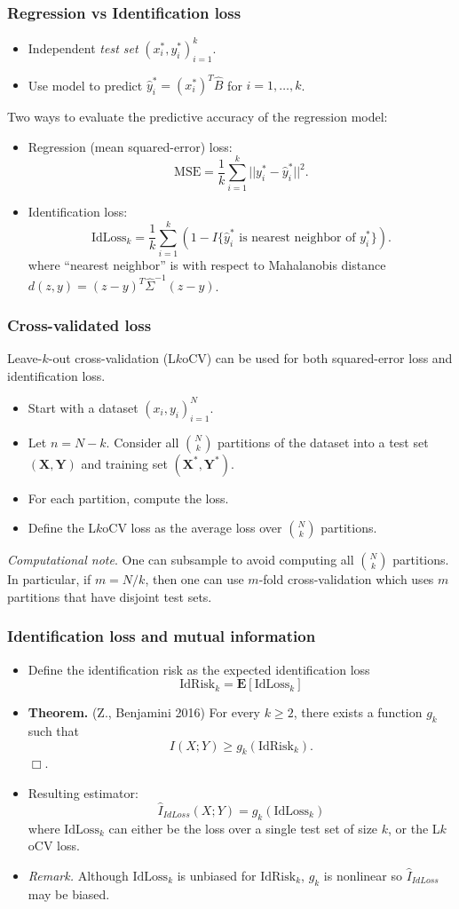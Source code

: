 \documentclass{beamer}
\newcommand{\E}{\textbf{E}}
\newcommand{\bX}{\boldsymbol{X}}
\newcommand{\bY}{\boldsymbol{Y}}
\begin{document}
\begin{frame}
\frametitle{Regression vs Identification loss}
\begin{itemize}
\item Independent \emph{test set} $(x_i^*, y_i^*)_{i=1}^k$. 
\item Use model to predict $\hat{y}_i^* = (x_i^*)^T \hat{B}$ for $i = 1,\hdots, k$.
\end{itemize}
Two ways to evaluate the predictive accuracy of the regression model:
\begin{itemize}
\item Regression (mean squared-error) loss:
\[
\text{MSE} = \frac{1}{k} \sum_{i=1}^k ||y_i^* - \hat{y}_i^*||^2.
\]
\item Identification loss:
\[
\text{IdLoss}_k = \frac{1}{k} \sum_{i=1}^k (1 - I\{\hat{y}_i^* \text{ is nearest neighbor of }y_i^*\}).
\]
where ``nearest neighbor'' is with respect to Mahalanobis distance $d(z,y) = (z-y)^T \hat{\Sigma}^{-1} (z-y)$.
\end{itemize}
\end{frame}

\begin{frame}
\frametitle{Cross-validated loss}
Leave-$k$-out cross-validation (L$k$oCV) can be used for both squared-error loss and identification loss.
\begin{itemize}
\item Start with a dataset $(x_i,y_i)_{i=1}^N$.
\item Let $n = N-k$.  Consider all ${N}\choose{k}$ partitions of the dataset into a test set $(\bX, \bY)$ and training set $(\bX^*, \bY^*)$.
\item For each partition, compute the loss.
\item Define the L$k$oCV loss as the average loss over ${N}\choose{k}$ partitions.
\end{itemize}
\emph{Computational note}.  One can subsample to avoid computing all
${N}\choose{k}$ partitions.  In particular, if $m = N/k$, then one can
use $m$-fold cross-validation which uses $m$ partitions that have
disjoint test sets.
\end{frame}

\begin{frame}
\frametitle{Identification loss and mutual information}
\begin{itemize}
\item Define the identification risk as the expected identification loss
\[
\text{IdRisk}_k = \E[\text{IdLoss}_k]
\]
\item \textbf{Theorem.} (Z., Benjamini 2016)
For every $k \geq 2$, there exists a function $g_k$ such that
\[
I(X; Y) \geq g_k(\text{IdRisk}_k).
\]
$\Box$.
\item Resulting estimator:
\[
\hat{I}_{IdLoss}(X; Y) = g_k(\text{IdLoss}_k)
\]
where $\text{IdLoss}_k$ can either be the loss over a single test set of size $k$, or the L$k$oCV loss.
\item \emph{Remark.} Although $\text{IdLoss}_k$ is unbiased for $\text{IdRisk}_k$, $g_k$ is nonlinear so $\hat{I}_{IdLoss}$ may be biased.
\end{itemize}
\end{frame}
\end{document}

